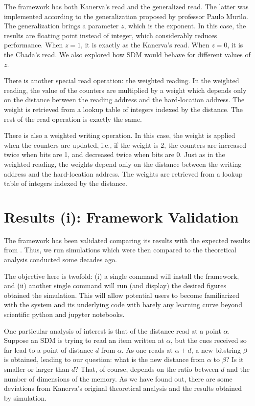 The framework has both Kanerva's read and the generalized read. The latter was implemented according to the generalization proposed by professor Paulo Murilo. The generalization brings a parameter $z$, which is the exponent. In this case, the results are floating point instead of integer, which considerably reduces performance. When $z=1$, it is exactly as the Kanerva's read. When $z=0$, it is the Chada's read. We also explored how SDM would behave for different values of $z$.

There is another special read operation: the weighted reading. In the weighted reading, the value of the counters are multiplied by a weight which depends only on the distance between the reading address and the hard-location address. The weight is retrieved from a lookup table of integers indexed by the distance. The rest of the read operation is exactly the same.

There is also a weighted writing operation. In this case, the weight is applied when the counters are updated, i.e., if the weight is 2, the counters are increased twice when bits are 1, and decreased twice when bits are 0. Just as in the weighted reading, the weights depend only on the distance between the writing address and the hard-location address. The weights are retrieved from a lookup table of integers indexed by the distance.


\chapter{Results (i): Framework Validation}

The framework has been validated comparing its results with the expected results from \citet{Kanerva1988}. Thus, we run simulations which were then compared to the theoretical analysis conducted some decades ago.

The objective here is twofold: (i) a single command will install the framework, and (ii) another single command will run (and display) the desired figures obtained the simulation. This will allow potential users to become familiarized with the system and its underlying code with barely any learning curve beyond scientific python and jupyter notebooks.

One particular analysis of interest is that of the distance read at a point $\alpha$. Suppose an SDM is trying to read an item written at $\alpha$, but the cues received so far lead to a point of distance $d$ from $\alpha$.  As one reads at $\alpha+d$, a new bitstring $\beta$ is obtained, leading to our question: what is the new distance from $\alpha$ to $\beta$? Is it smaller or larger than $d$? That, of course, depends on the ratio between $d$ and the number of dimensions of the memory.  As we have found out, there are some deviations from Kanerva's original theoretical analysis and the results obtained by simulation.


